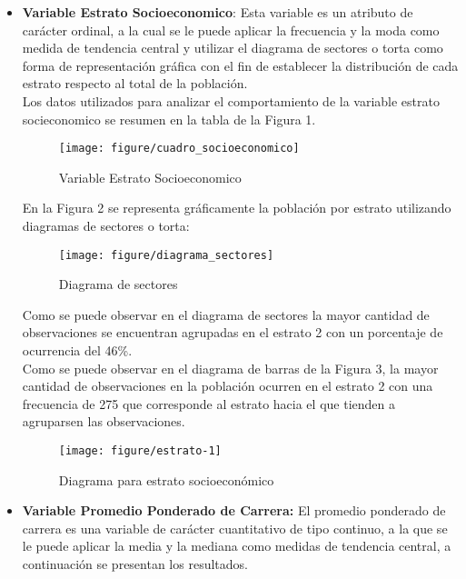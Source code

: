\documentclass[conference]{IEEEtran}\usepackage[]{graphicx}\usepackage[]{color}
\makeatletter
\def\maxwidth{ %
  \ifdim\Gin@nat@width>\linewidth
    \linewidth
  \else
    \Gin@nat@width
  \fi
}
\makeatother
\begin{document}
  \begin{itemize}
	\item \textbf {Variable Estrato Socioeconomico}: Esta variable es un atributo de carácter ordinal, a la cual se le puede aplicar la frecuencia y la moda como medida de tendencia central y utilizar el diagrama de sectores o torta como forma de representación gráfica con el fin de establecer la distribución de cada estrato respecto al total de la población.  \\
	
	Los datos utilizados para analizar el comportamiento de la variable estrato socieconomico se resumen en la tabla de la Figura 1.
	
	\bigskip
	\begin{figure} [ht]
		\centering
		\texttt{[image: figure/cuadro\_socioeconomico]}
		\caption{Variable Estrato Socioeconomico}
		\label{fig:cuadro_socioeconomico}
	\end{figure}

	En la Figura 2 se representa gráficamente la población por estrato utilizando diagramas de sectores o torta:  
	\bigskip

	\begin{figure} [ht]
		\centering
		\texttt{[image: figure/diagrama\_sectores]}
		\caption{Diagrama de sectores}
		\label{fig:diagrama_sectores}
	\end{figure}

	Como se puede observar en el diagrama de sectores la mayor cantidad de observaciones se encuentran agrupadas en el estrato 2 con un porcentaje de ocurrencia del 46\%.\\
	   
	Como se puede observar en el diagrama de barras de la Figura 3, la mayor cantidad de observaciones en la población ocurren en el estrato 2 con una frecuencia de 275 que corresponde al estrato hacia el que tienden a agruparsen las observaciones.
   
	\begin{figure}[ht]
		\centering

\texttt{[image: figure/estrato-1]} 

		\caption{Diagrama para estrato socioeconómico}
		\label{fig:diagrama_barras}
	\end{figure}

  	\item \textbf {Variable Promedio Ponderado de Carrera:}
	El promedio ponderado de carrera es una variable de carácter cuantitativo de tipo continuo, a la que se le puede aplicar la media y la mediana como medidas de tendencia central, a continuación se presentan los resultados.
	


\end{itemize}
\end{document}
